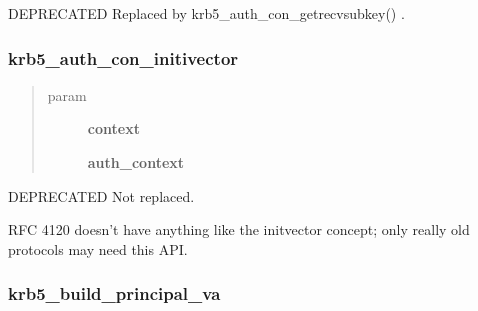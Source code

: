 \documentclass[letterpaper,10pt,english]{sphinxmanual}
\begin{document}
DEPRECATED Replaced by krb5\_auth\_con\_getrecvsubkey() .


\subsubsection{krb5\_auth\_con\_initivector}
\label{appdev/refs/api/krb5_auth_con_initivector:krb5-auth-con-initivector}\label{appdev/refs/api/krb5_auth_con_initivector::doc}

\begin{fulllineitems}
\label{appdev/refs/api/krb5_auth_con_initivector:krb5_auth_con_initivector}
\end{fulllineitems}

\begin{quote}\begin{description}
\item[{param}] \leavevmode
\textbf{context}

\textbf{auth\_context}

\end{description}\end{quote}

DEPRECATED Not replaced.

RFC 4120 doesn't have anything like the initvector concept; only really old protocols may need this API.


\subsubsection{krb5\_build\_principal\_va}
\label{appdev/refs/api/krb5_build_principal_va:krb5-build-principal-va}\label{appdev/refs/api/krb5_build_principal_va::doc}

\begin{fulllineitems}
\label{appdev/refs/api/krb5_build_principal_va:krb5_build_principal_va}
\end{fulllineitems}
\end{document}
